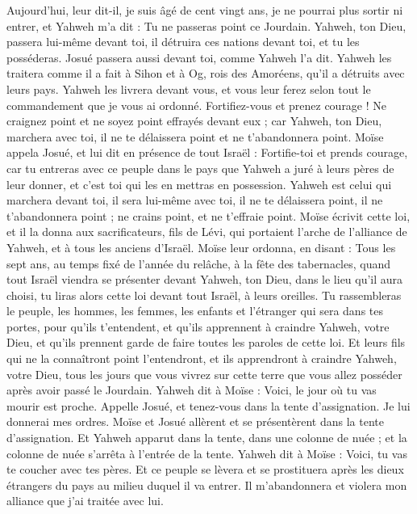 \begin{multicols}{2}
Aujourd'hui, leur dit-il, je suis âgé de cent vingt ans, je ne pourrai plus sortir ni entrer, et Yahweh m'a dit : Tu ne passeras point ce Jourdain.
Yahweh, ton Dieu, passera lui-même devant toi, il détruira ces nations devant toi, et tu les posséderas. Josué passera aussi devant toi, comme Yahweh l'a dit.
Yahweh les traitera comme il a fait à Sihon et à Og, rois des Amoréens, qu'il a détruits avec leurs pays.
Yahweh les livrera devant vous, et vous leur ferez selon tout le commandement que je vous ai ordonné.
Fortifiez-vous et prenez courage ! Ne craignez point et ne soyez point effrayés devant eux ; car Yahweh, ton Dieu, marchera avec toi, il ne te délaissera point et ne t'abandonnera point.
Moïse appela Josué, et lui dit en présence de tout Israël : Fortifie-toi et prends courage, car tu entreras avec ce peuple dans le pays que Yahweh a juré à leurs pères de leur donner, et c'est toi qui les en mettras en possession.
Yahweh est celui qui marchera devant toi, il sera lui-même avec toi, il ne te délaissera point, il ne t'abandonnera point ; ne crains point, et ne t'effraie point.
Moïse écrivit cette loi, et il la donna aux sacrificateurs, fils de Lévi, qui portaient l'arche de l'alliance de Yahweh, et à tous les anciens d'Israël.
Moïse leur ordonna, en disant : Tous les sept ans, au temps fixé de l'année du relâche, à la fête des tabernacles,
quand tout Israël viendra se présenter devant Yahweh, ton Dieu, dans le lieu qu'il aura choisi, tu liras alors cette loi devant tout Israël, à leurs oreilles.
Tu rassembleras le peuple, les hommes, les femmes, les enfants et l'étranger qui sera dans tes portes, pour qu'ils t'entendent, et qu'ils apprennent à craindre Yahweh, votre Dieu, et qu'ils prennent garde de faire toutes les paroles de cette loi.
Et leurs fils qui ne la connaîtront point l'entendront, et ils apprendront à craindre Yahweh, votre Dieu, tous les jours que vous vivrez sur cette terre que vous allez posséder après avoir passé le Jourdain.
Yahweh dit à Moïse : Voici, le jour où tu vas mourir est proche. Appelle Josué, et tenez-vous dans la tente d'assignation. Je lui donnerai mes ordres. Moïse et Josué allèrent et se présentèrent dans la tente d'assignation.
Et Yahweh apparut dans la tente, dans une colonne de nuée ; et la colonne de nuée s'arrêta à l'entrée de la tente.
Yahweh dit à Moïse : Voici, tu vas te coucher avec tes pères. Et ce peuple se lèvera et se prostituera après les dieux étrangers du pays au milieu duquel il va entrer. Il m'abandonnera et violera mon alliance que j'ai traitée avec lui.

\end{multicols}
